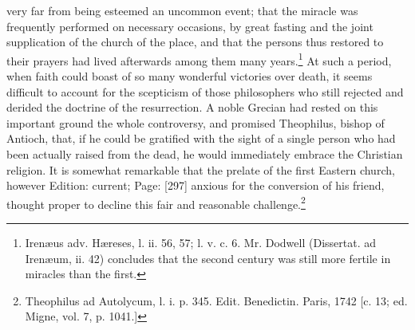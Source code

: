 very far from being esteemed an uncommon event; that the miracle was frequently performed on necessary occasions, by great fasting and the joint supplication of the church of the place, and that the persons thus restored to their prayers had lived afterwards among them many years.\footnote{Irenæus adv. Hæreses, l. ii. 56, 57; l. v. c. 6. Mr. Dodwell (Dissertat. ad Irenæum, ii. 42) concludes that the second century was still more fertile in miracles than the first.} At such a period, when faith could boast of so many wonderful victories over death, it seems difficult to account for the scepticism of those philosophers who still rejected and derided the doctrine of the resurrection. A noble Grecian had rested on this important ground the whole controversy, and promised Theophilus, bishop of Antioch, that, if he could be gratified with the sight of a single person who had been actually raised from the dead, he would immediately embrace the Christian religion. It is somewhat remarkable that the prelate of the first Eastern church, however Edition: current; Page: [297] anxious for the conversion of his friend, thought proper to decline this fair and reasonable challenge.\footnote{Theophilus ad Autolycum, l. i. p. 345. Edit. Benedictin. Paris, 1742 [c. 13; ed. Migne, vol. 7, p. 1041.]}


